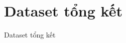 \documentclass[aspectratio=169,11pt]{beamer}
\def\textbf#1{#1}%
\def\\{ }%
\begin{document}




\section{Dataset tổng kết}
{

\begin{frame}[plain]
    \vfill
    \centering
    \textcolor{hcmusblue}{\textbf{\Huge Dataset tổng kết}}
    \vfill
\end{frame}
}
\end{document}
